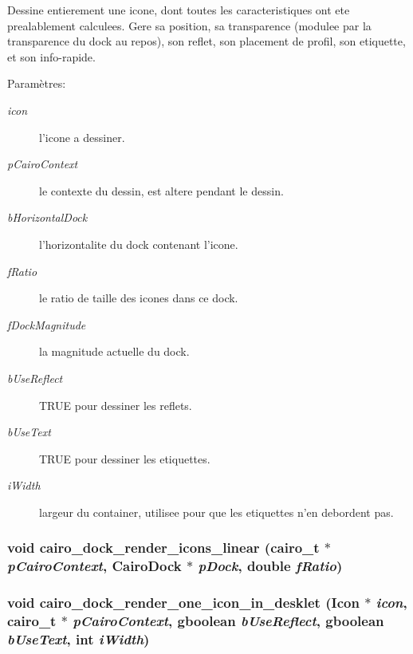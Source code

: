 Dessine entierement une icone, dont toutes les caracteristiques ont ete prealablement calculees. Gere sa position, sa transparence (modulee par la transparence du dock au repos), son reflet, son placement de profil, son etiquette, et son info-rapide. \begin{Desc}
\item[Paramètres:]
\begin{description}
\item[{\em icon}]l'icone a dessiner. \item[{\em pCairoContext}]le contexte du dessin, est altere pendant le dessin. \item[{\em bHorizontalDock}]l'horizontalite du dock contenant l'icone. \item[{\em fRatio}]le ratio de taille des icones dans ce dock. \item[{\em fDockMagnitude}]la magnitude actuelle du dock. \item[{\em bUseReflect}]TRUE pour dessiner les reflets. \item[{\em bUseText}]TRUE pour dessiner les etiquettes. \item[{\em iWidth}]largeur du container, utilisee pour que les etiquettes n'en debordent pas. \end{description}
\end{Desc}
\subsubsection{\setlength{\rightskip}{0pt plus 5cm}void cairo\_\-dock\_\-render\_\-icons\_\-linear (cairo\_\-t $\ast$ {\em pCairoContext}, {\bf CairoDock} $\ast$ {\em pDock}, double {\em fRatio})}\label{cairo-dock-draw_8h_4360118a269b12c5acfdbf2d294db3ed}


\subsubsection{\setlength{\rightskip}{0pt plus 5cm}void cairo\_\-dock\_\-render\_\-one\_\-icon\_\-in\_\-desklet ({\bf Icon} $\ast$ {\em icon}, cairo\_\-t $\ast$ {\em pCairoContext}, gboolean {\em bUseReflect}, gboolean {\em bUseText}, int {\em iWidth})}\label{cairo-dock-draw_8h_3c956bf2c6470a4acab797dbf40a0d6c}



